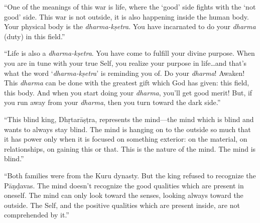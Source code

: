 \enquote{One of the meanings of this war is life, where the \enquote{good} side fights with the \enquote{not good} side. This war is not outside, it is also happening inside the human body. Your physical body is the \textit{dharma-kṣetra}. You have incarnated to do your \textit{dharma} (duty) in this field.}

\enquote{Life is also a \textit{dharma-kṣetra}. You have come to fulfill your divine purpose. When you are in tune with your true Self, you realize your purpose in life\ldots and that’s what the word \enquote{\textit{dharma-kṣetra}} is reminding you of. Do your \textit{dharma}! Awaken! This \textit{dharma} can be done with the greatest gift which God has given: this field, this body. And when you start doing your \textit{dharma}, you’ll get good merit! But, if you run away from your \textit{dharma}, then you turn toward the dark side.}

\enquote{This blind king, Dhṛtarāṣṭra, represents the mind---the mind which is blind and wants to always stay blind. The mind is hanging on to the outside so much that it has power only when it is focused on something exterior: on the material, on relationships, on gaining this or that. This is the nature of the mind. The mind is blind.}

\enquote{Both families were from the Kuru dynasty. But the king refused to recognize the Pāṇḍavas. The mind doesn’t recognize the good qualities which are present in oneself. The mind can only look toward the senses, looking always toward the outside. The Self, and the positive qualities which are present inside, are not comprehended by it.}
